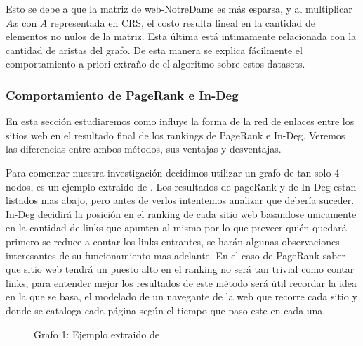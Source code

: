 Esto se debe a que la matriz de web-NotreDame es más esparsa, y al multiplicar $Ax$ con $A$ representada en CRS, el costo resulta lineal en la cantidad de elementos no nulos de la matriz. Esta última está intimamente relacionada con la cantidad de aristas del grafo. De esta manera se explica fácilmente el comportamiento a priori extraño de el algoritmo sobre estos datasets.


\subsubsection{Comportamiento de PageRank e In-Deg}

En esta sección estudiaremos como influye la forma de la red de enlaces entre los sitios web en el resultado final de los rankings de PageRank e In-Deg. Veremos las diferencias entre ambos métodos, sus ventajas y desventajas.

Para comenzar nuestra investigación decidimos utilizar un grafo de tan solo 4 nodos, es un ejemplo extraido de \cite{Bryan2006}. Los resultados de pageRank y de In-Deg estan listados mas abajo, pero antes de verlos intentemos analizar que debería suceder. In-Deg decidirá la posición en el ranking de cada sitio web basandose unicamente en la cantidad de links que apunten al mismo por lo que preveer quién quedará primero se reduce a contar los links entrantes, se harán algunas observaciones interesantes de su funcionamiento mas adelante. En el caso de PageRank saber que sitio web tendrá un puesto alto en el ranking no será tan trivial como contar links, para entender mejor los resultados de este método será útil recordar la idea en la que se basa, el modelado de un navegante de la web que recorre cada sitio y donde se cataloga cada página según el tiempo que paso este en cada una.

\begin{figure}[H]
\centering
{}
  \caption{\footnotesize{ Grafo 1: Ejemplo extraido de \cite{Bryan2006} }}
  \label{fig:Rankings}
\end{figure}

